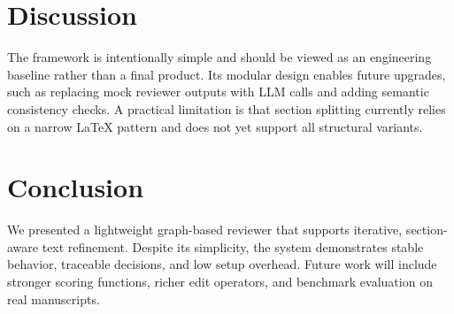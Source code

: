 \section{Discussion}
The framework is intentionally simple and should be viewed as an engineering baseline rather than a final product.
Its modular design enables future upgrades, such as replacing mock reviewer outputs with LLM calls and adding semantic consistency checks.
A practical limitation is that section splitting currently relies on a narrow LaTeX pattern and does not yet support all structural variants.

\section{Conclusion}
We presented a lightweight graph-based reviewer that supports iterative, section-aware text refinement.
Despite its simplicity, the system demonstrates stable behavior, traceable decisions, and low setup overhead.
Future work will include stronger scoring functions, richer edit operators, and benchmark evaluation on real manuscripts.
